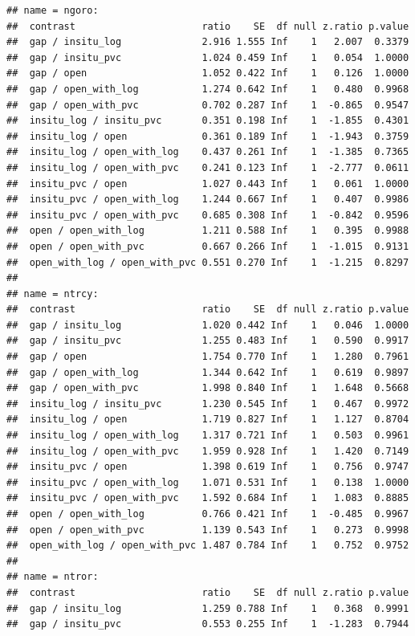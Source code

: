 \documentclass[
]{article}
\begin{document}
\begin{verbatim}
## name = ngoro:
##  contrast                      ratio    SE  df null z.ratio p.value
##  gap / insitu_log              2.916 1.555 Inf    1   2.007  0.3379
##  gap / insitu_pvc              1.024 0.459 Inf    1   0.054  1.0000
##  gap / open                    1.052 0.422 Inf    1   0.126  1.0000
##  gap / open_with_log           1.274 0.642 Inf    1   0.480  0.9968
##  gap / open_with_pvc           0.702 0.287 Inf    1  -0.865  0.9547
##  insitu_log / insitu_pvc       0.351 0.198 Inf    1  -1.855  0.4301
##  insitu_log / open             0.361 0.189 Inf    1  -1.943  0.3759
##  insitu_log / open_with_log    0.437 0.261 Inf    1  -1.385  0.7365
##  insitu_log / open_with_pvc    0.241 0.123 Inf    1  -2.777  0.0611
##  insitu_pvc / open             1.027 0.443 Inf    1   0.061  1.0000
##  insitu_pvc / open_with_log    1.244 0.667 Inf    1   0.407  0.9986
##  insitu_pvc / open_with_pvc    0.685 0.308 Inf    1  -0.842  0.9596
##  open / open_with_log          1.211 0.588 Inf    1   0.395  0.9988
##  open / open_with_pvc          0.667 0.266 Inf    1  -1.015  0.9131
##  open_with_log / open_with_pvc 0.551 0.270 Inf    1  -1.215  0.8297
## 
## name = ntrcy:
##  contrast                      ratio    SE  df null z.ratio p.value
##  gap / insitu_log              1.020 0.442 Inf    1   0.046  1.0000
##  gap / insitu_pvc              1.255 0.483 Inf    1   0.590  0.9917
##  gap / open                    1.754 0.770 Inf    1   1.280  0.7961
##  gap / open_with_log           1.344 0.642 Inf    1   0.619  0.9897
##  gap / open_with_pvc           1.998 0.840 Inf    1   1.648  0.5668
##  insitu_log / insitu_pvc       1.230 0.545 Inf    1   0.467  0.9972
##  insitu_log / open             1.719 0.827 Inf    1   1.127  0.8704
##  insitu_log / open_with_log    1.317 0.721 Inf    1   0.503  0.9961
##  insitu_log / open_with_pvc    1.959 0.928 Inf    1   1.420  0.7149
##  insitu_pvc / open             1.398 0.619 Inf    1   0.756  0.9747
##  insitu_pvc / open_with_log    1.071 0.531 Inf    1   0.138  1.0000
##  insitu_pvc / open_with_pvc    1.592 0.684 Inf    1   1.083  0.8885
##  open / open_with_log          0.766 0.421 Inf    1  -0.485  0.9967
##  open / open_with_pvc          1.139 0.543 Inf    1   0.273  0.9998
##  open_with_log / open_with_pvc 1.487 0.784 Inf    1   0.752  0.9752
## 
## name = ntror:
##  contrast                      ratio    SE  df null z.ratio p.value
##  gap / insitu_log              1.259 0.788 Inf    1   0.368  0.9991
##  gap / insitu_pvc              0.553 0.255 Inf    1  -1.283  0.7944

\end{verbatim}
\end{document}
